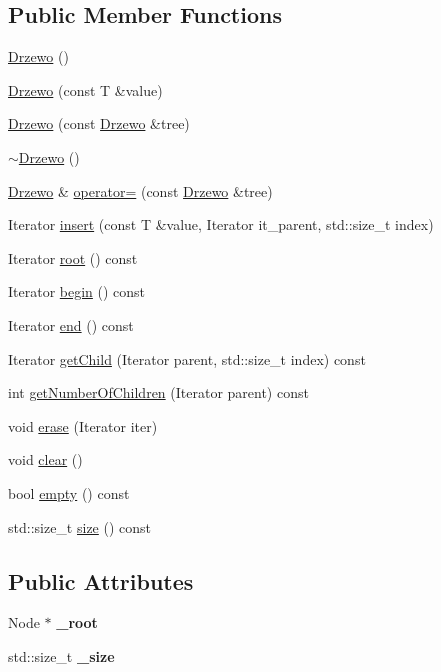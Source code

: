 \subsection*{Public Member Functions}
\begin{DoxyCompactItemize}
\item 
\hyperlink{class_drzewo_a9b87f8101458fea6c866ffd01efa9ef6}{Drzewo} ()
\item 
\hyperlink{class_drzewo_aca8b3e3da416a8e0221c1199ceb579c8}{Drzewo} (const T \&value)
\item 
\hyperlink{class_drzewo_a88fdcfad4e56e0053e34d493f656f61f}{Drzewo} (const \hyperlink{class_drzewo}{Drzewo} \&tree)
\item 
\hyperlink{class_drzewo_acbc76af50077660d8a75eaa4e086eac1}{$\sim$\+Drzewo} ()
\item 
\hyperlink{class_drzewo}{Drzewo} \& \hyperlink{class_drzewo_ab5b78c9c5c3b69ddc44018a53733badf}{operator=} (const \hyperlink{class_drzewo}{Drzewo} \&tree)
\item 
Iterator \hyperlink{class_drzewo_a2a8b76e1514a1823c0ee95e96b1a5553}{insert} (const T \&value, Iterator it\+\_\+parent, std\+::size\+\_\+t index)
\item 
Iterator \hyperlink{class_drzewo_a38d0437561533042f513df6db1ae9688}{root} () const
\item 
Iterator \hyperlink{class_drzewo_a73e93ed5f5c9768143a48f3244bb0b76}{begin} () const
\item 
Iterator \hyperlink{class_drzewo_a4d594d3e08d1c4e21223c106baef0013}{end} () const
\item 
Iterator \hyperlink{class_drzewo_aa82184dbff4418f916378bb2d861012e}{get\+Child} (Iterator parent, std\+::size\+\_\+t index) const
\item 
int \hyperlink{class_drzewo_a4ce176ba0ad39902d681d900c4b6163d}{get\+Number\+Of\+Children} (Iterator parent) const
\item 
void \hyperlink{class_drzewo_a34da2244db4e0ddfaa094d856099b091}{erase} (Iterator iter)
\item 
void \hyperlink{class_drzewo_ab40006bf25bf232befcd4643a8c527cf}{clear} ()
\item 
bool \hyperlink{class_drzewo_af02b0705726b31926a1a3e0b8bbef233}{empty} () const
\item 
std\+::size\+\_\+t \hyperlink{class_drzewo_a778ee17b16674b9d0577d22f5d55fa04}{size} () const
\end{DoxyCompactItemize}
\subsection*{Public Attributes}
\begin{DoxyCompactItemize}
\item 
\mbox{\label{class_drzewo_a3b2c561ed98ae6d50affe3f871b5c89d}} 
Node $\ast$ {\bfseries \+\_\+root}
\item 
\mbox{\label{class_drzewo_a7286876ce56a8ff1a04a58ff526aa7da}} 
std\+::size\+\_\+t {\bfseries \+\_\+size}
\end{DoxyCompactItemize}


